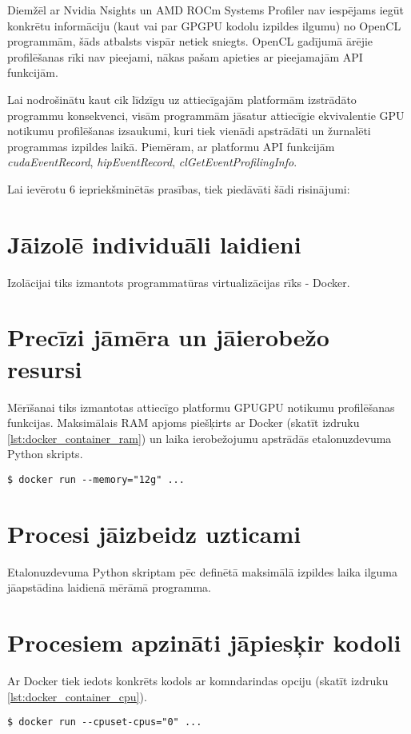 Diemžēl ar Nvidia Nsights un AMD ROCm Systems Profiler nav iespējams iegūt
konkrētu informāciju (kaut vai par GPGPU kodolu izpildes ilgumu) no OpenCL
programmām, šāds atbalsts vispār netiek
sniegts.\cite{rocm_sys_profiler_use_case} OpenCL gadījumā ārējie profilēšanas
rīki nav pieejami, nākas pašam apieties ar pieejamajām API funkcijām.

Lai nodrošinātu kaut cik līdzīgu uz attiecīgajām platformām izstrādāto
programmu konsekvenci, visām programmām jāsatur attiecīgie ekvivalentie GPU
notikumu profilēšanas izsaukumi, kuri tiek vienādi apstrādāti un žurnalēti
programmas izpildes laikā. Piemēram, ar platformu API funkcijām
\textit{cudaEventRecord}, \textit{hipEventRecord},
\textit{clGetEventProfilingInfo}.



Lai ievērotu 6 iepriekšminētās prasības, tiek piedāvāti šādi risinājumi:

\section{Jāizolē individuāli laidieni}
Izolācijai tiks izmantots programmatūras virtualizācijas rīks - Docker.
\cite{docker-docs-engine}

\section{Precīzi jāmēra un jāierobežo resursi}
Mērīšanai tiks izmantotas attiecīgo platformu GPUGPU notikumu profilēšanas
funkcijas. Maksimālais RAM apjoms piešķirts ar Docker (skatīt izdruku
\ref{lst:docker_container_ram}) un laika ierobežojumu apstrādās etalonuzdevuma
Python skripts.
\begin{lstlisting}[caption={Docker konteinera palaišana, piešķirot tam konkrēti
    12GiB RAM},
  captionpos=b,
label=lst:docker_container_ram]
$ docker run --memory="12g" ...
\end{lstlisting}

\section{Procesi jāizbeidz uzticami}
Etalonuzdevuma Python skriptam pēc definētā maksimālā izpildes laika ilguma
jāapstādina laidienā mērāmā programma.

\section{Procesiem apzināti jāpiesķir kodoli}
Ar Docker tiek iedots konkrēts kodols ar komndarindas opciju (skatīt izdruku
\ref{lst:docker_container_cpu}).
\begin{lstlisting}[caption={Docker konteinera palaišana, piešķirot tam konkrēti
    pirmo CPU kodolu}, captionpos=b label=lst:docker_container_cpu]
$ docker run --cpuset-cpus="0" ...
\end{lstlisting}

